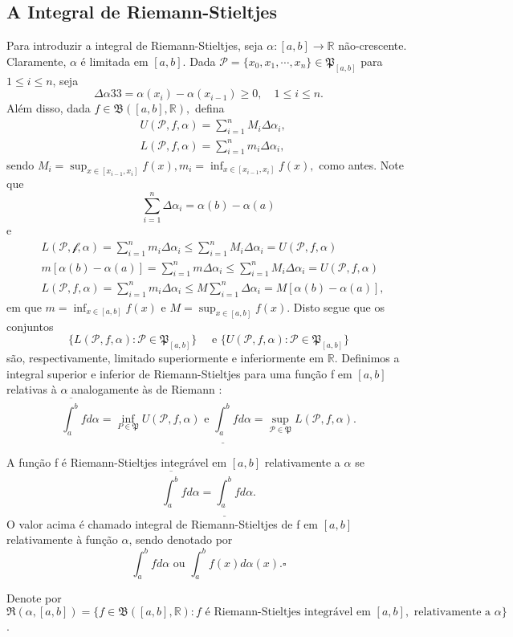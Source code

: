 \documentclass[Analysis/analysis_notes.tex]{subfiles}
\begin{document}
\subsection{A Integral de Riemann-Stieltjes}
Para introduzir a integral de Riemann-Stieltjes, seja \(\alpha :[a, b]\rightarrow \mathbb{R}\) não-crescente. Claramente, \(\alpha \) é limitada em \([a, b]\).
Dada \(\mathcal{P}=\{x_{0}, x_{1}, \cdots, x_{n}\}\in \mathfrak{P}_{[a, b]}\) para \(1\leq i\leq n\), seja 
  \[
    \Delta \alpha 33 = \alpha (x_{i}) - \alpha (x_{i-1})\geq 0,\quad 1\leq i\leq n.
  \]
  Além disso, dada \(f\in \mathfrak{B}([a, b], \mathbb{R}),\) defina 
 \begin{align*}
   &U(\mathcal{P}, f, \alpha ) = \sum\limits_{i=1}^{n}M_{i}\Delta \alpha_{i},\\
   &L(\mathcal{P}, f, \alpha ) = \sum\limits_{i=1}^{n}m_{i}\Delta \alpha_{i},
 \end{align*}
 sendo \(M_{i} = \sup_{x\in[x_{i-1}, x_{i}]}f(x), m_{i} = \inf_{x\in[x_{i-1}, x_{i}]}f(x),\) como antes.
 Note que 
   \[
     \sum\limits_{i=1}^{n}\Delta \alpha_{i} = \alpha (b) - \alpha (a)
   \]
  e 
 \begin{align*}
      &L(\mathcal{P, f, \alpha }) = \sum\limits_{i=1}^{n}m_{i}\Delta \alpha_{i}\leq \sum\limits_{i=1}^{n}M_{i}\Delta \alpha_{i} = U(\mathcal{P}, f, \alpha )\\
      &m[\alpha (b) - \alpha (a)] = \sum\limits_{i=1}^{n}m\Delta \alpha_{i}\leq \sum\limits_{i=1}^{n}M_{i}\Delta \alpha_{i} = U(\mathcal{P}, f, \alpha )\\
      &L(\mathcal{P}, f, \alpha ) = \sum\limits_{i=1}^{n}m_{i}\Delta \alpha_{i}\leq M \sum\limits_{i=1}^{n}\Delta \alpha_{i} = M[\alpha (b)-\alpha (a)],
 \end{align*}
 em que \(m = \inf_{x\in[a,b]}f(x)\) e \(M=\sup_{x\in[a, b]}f(x).\) Disto segue que os conjuntos 
   \[
     \{L(\mathcal{P}, f, \alpha ): \mathcal{P}\in \mathfrak{P}_{[a, b]}\}\quad\text{ e } \{U(\mathcal{P}, f, \alpha ): \mathcal{P}\in \mathfrak{P}_{[a, b]}\}
   \]
são, respectivamente, limitado superiormente e inferiormente em \(\mathbb{R}.\) Definimos a integral superior
e inferior de Riemann-Stieltjes para uma fun\c cão f em \([a, b]\) relativas à \(\alpha \) analogamente às de Riemann : 
  \[
    \overline{\int_{a}^{b}}f d\alpha =\inf_{P\in \mathfrak{P}}U(\mathcal{P}, f, \alpha ) \text{ e } \underline{\int_{a}^{b}}f d\alpha =\sup_{\mathcal{P}\in \mathfrak{P}}L(\mathcal{P}, f, \alpha ).
  \]
 \begin{def*}
   A fun\c cão f é Riemann-Stieltjes integrável em \([a, b]\) relativamente a \(\alpha \) se 
     \[
       \overline{\int_{a}^{b}}f d\alpha  = \underline{\int_{a}^{b}}fd\alpha .
     \]
     O valor acima é chamado integral de Riemann-Stieltjes de f em \([a, b]\) relativamente à fun\c cão \(\alpha \), sendo denotado por 
       \[
         \int_{a}^{b} f d\alpha \text{ ou } \int_{a}^{b} f(x) d\alpha (x). \square
       \]
 \end{def*}
 Denote por \(\mathfrak{R}(\alpha , [a, b]) = \{f\in \mathfrak{B}([a, b], \mathbb{R}): f\text{ é Riemann-Stieltjes integrável em }[a, b],\text{ relativamente a }\alpha \}\).
\end{document}
